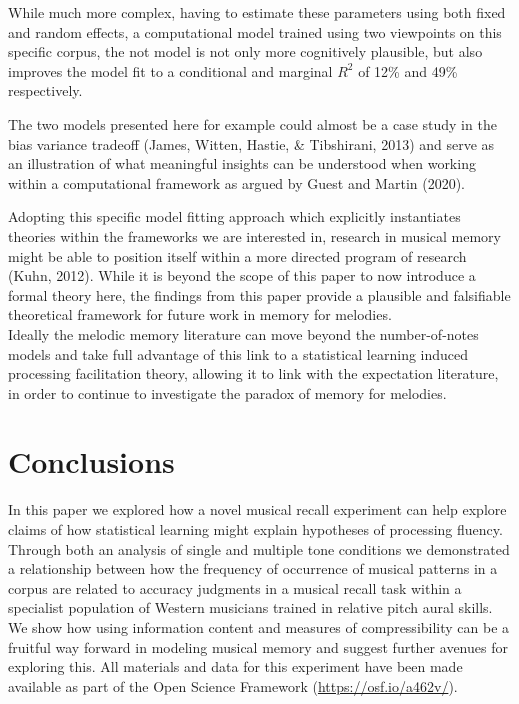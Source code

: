 \documentclass[english,man,floatsintext]{apa6}
\begin{document}
While much more complex, having to estimate these parameters using both fixed and random effects, a computational model trained using two viewpoints on this specific corpus, the not model is not only more cognitively plausible, but also improves the model fit to a conditional and marginal \(R^2\) of 12\% and 49\% respectively.

The two models presented here for example could almost be a case study in the bias variance tradeoff (James, Witten, Hastie, \& Tibshirani, 2013) and serve as an illustration of what meaningful insights can be understood when working within a computational framework as argued by Guest and Martin (2020).

Adopting this specific model fitting approach which explicitly instantiates theories within the frameworks we are interested in, research in musical memory might be able to position itself within a more directed program of research (Kuhn, 2012).
While it is beyond the scope of this paper to now introduce a formal theory here, the findings from this paper provide a plausible and falsifiable theoretical framework for future work in memory for melodies.\\
Ideally the melodic memory literature can move beyond the number-of-notes models and take full advantage of this link to a statistical learning induced processing facilitation theory, allowing it to link with the expectation literature, in order to continue to investigate the paradox of memory for melodies.

\hypertarget{conclusions}{%
\section{Conclusions}\label{conclusions}}

In this paper we explored how a novel musical recall experiment can help explore claims of how statistical learning might explain hypotheses of processing fluency.
Through both an analysis of single and multiple tone conditions we demonstrated a relationship between how the frequency of occurrence of musical patterns in a corpus are related to accuracy judgments in a musical recall task within a specialist population of Western musicians trained in relative pitch aural skills.
We show how using information content and measures of compressibility can be a fruitful way forward in modeling musical memory and suggest further avenues for exploring this.
All materials and data for this experiment have been made available as part of the Open Science Framework (\url{https://osf.io/a462v/}).
\end{document}
